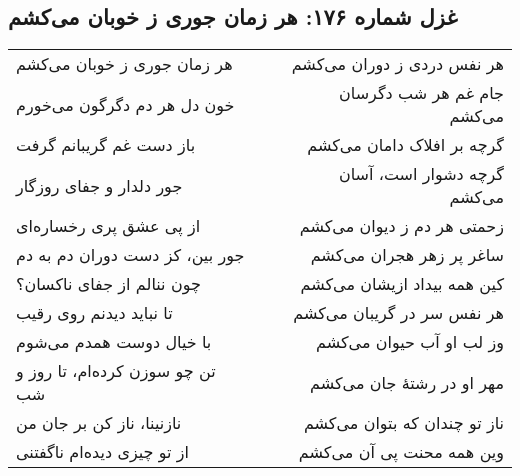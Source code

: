 \begin{center}
\section*{غزل شماره ۱۷۶: هر زمان جوری ز خوبان می‌کشم}
\label{sec:176}
\begin{longtable}{l p{0.5cm} r}
هر زمان جوری ز خوبان می‌کشم
&&
هر نفس دردی ز دوران می‌کشم
\\
خون دل هر دم دگرگون می‌خورم
&&
جام غم هر شب دگرسان می‌کشم
\\
باز دست غم گریبانم گرفت
&&
گرچه بر افلاک دامان می‌کشم
\\
جور دلدار و جفای روزگار
&&
گرچه دشوار است، آسان می‌کشم
\\
از پی عشق پری رخساره‌ای
&&
زحمتی هر دم ز دیوان می‌کشم
\\
جور بین، کز دست دوران دم به دم
&&
ساغر پر زهر هجران می‌کشم
\\
چون ننالم از جفای ناکسان؟
&&
کین همه بیداد ازیشان می‌کشم
\\
تا نباید دیدنم روی رقیب
&&
هر نفس سر در گریبان می‌کشم
\\
با خیال دوست همدم می‌شوم
&&
وز لب او آب حیوان می‌کشم
\\
تن چو سوزن کرده‌ام، تا روز و شب
&&
مهر او در رشتهٔ جان می‌کشم
\\
نازنینا، ناز کن بر جان من
&&
ناز تو چندان که بتوان می‌کشم
\\
از تو چیزی دیده‌ام ناگفتنی
&&
وین همه محنت پی آن می‌کشم
\\
\end{longtable}
\end{center}
